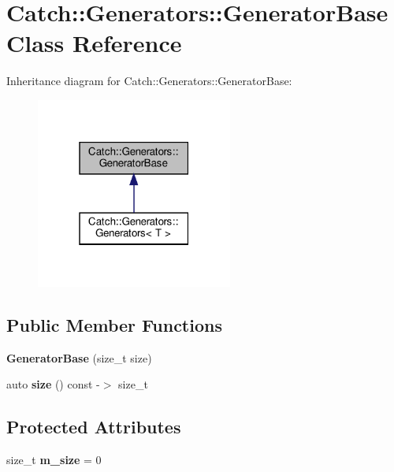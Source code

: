\hypertarget{classCatch_1_1Generators_1_1GeneratorBase}{}\section{Catch\+::Generators\+::Generator\+Base Class Reference}
\label{classCatch_1_1Generators_1_1GeneratorBase}


Inheritance diagram for Catch\+::Generators\+::Generator\+Base\+:
\nopagebreak
\begin{figure}[H]
\begin{center}
\leavevmode
\includegraphics[width=183pt]{classCatch_1_1Generators_1_1GeneratorBase__inherit__graph}
\end{center}
\end{figure}
\subsection*{Public Member Functions}
\begin{DoxyCompactItemize}
\item 
\mbox{\label{classCatch_1_1Generators_1_1GeneratorBase_ab003974d458a14acfb48f79e7e8abe21}} 
{\bfseries Generator\+Base} (size\+\_\+t size)
\item 
\mbox{\label{classCatch_1_1Generators_1_1GeneratorBase_a2fb4a5c153f3fdc2708245b40751b487}} 
auto {\bfseries size} () const -\/$>$ size\+\_\+t
\end{DoxyCompactItemize}
\subsection*{Protected Attributes}
\begin{DoxyCompactItemize}
\item 
\mbox{\label{classCatch_1_1Generators_1_1GeneratorBase_ac6ab90adfdda9401e2ea03db5b2dfc6a}} 
size\+\_\+t {\bfseries m\+\_\+size} = 0
\end{DoxyCompactItemize}


